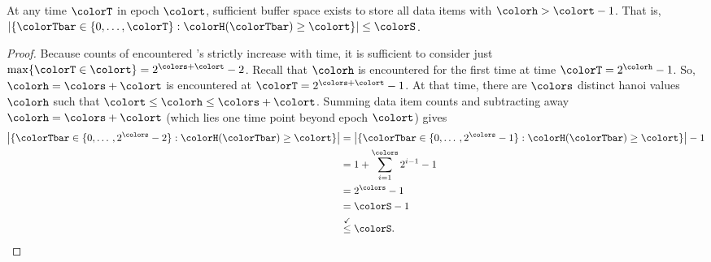 \begin{lemma} \label{thm:steady-hv-geq-epoch}

At any time $\colorT$ in epoch $\colort$, sufficient buffer space exists to store all data items with \hv{} $\colorh > \colort - 1$.
That is, $\left| \{\colorTbar \in \{0, \ldots, \colorT \} : \colorH(\colorTbar) \geq \colort \} \right| \leq \colorS$.
\end{lemma}

\begin{proof}
Because counts of encountered \hv{}'s strictly increase with time, it is sufficient to consider just $\max\{\colorT \in \colort\} = 2^{\colors + \colort} - 2$.
Recall that \hv{} $\colorh$ is encountered for the first time at time $\colorT = 2^{\colorh} - 1$.
So, \hv{} $\colorh = \colors + \colort$ is encountered at $\colorT = 2^{\colors + \colort} - 1$.
At that time, there are $\colors$ distinct hanoi values $\colorh$ such that $\colort \leq \colorh \leq \colors + \colort$.
Summing \hv{} data item counts and subtracting away $\colorh = \colors + \colort$ (which lies one time point beyond epoch $\colort$) gives
\begin{align*}
\left| \{\colorTbar \in \{0, \ldots\, , 2^{\colors} - 2 \} : \colorH(\colorTbar) \geq \colort \} \right|
&= \left| \{\colorTbar \in \{0, \ldots \, , 2^{\colors} - 1 \} : \colorH(\colorTbar) \geq \colort \} \right| - 1\\
&= 1 + \sum_{i=1}^{\colors} 2^{i - 1} - 1 \\
&= 2^{\colors} - 1 \\
&= \colorS - 1\\
&\stackrel{\checkmark}{\leq} \colorS.
\end{align*}
\end{proof}
